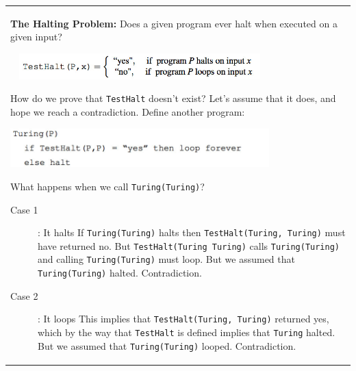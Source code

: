 {\tabulinesep=1mm
\begin{tabu}{|p{16cm} |}
\hline
\textbf{The Halting Problem:} Does a given program ever halt when executed 
on a given input?
\begin{center}
\includegraphics[width=10cm, height=1cm]{intro_testhalt.jpg}
\end{center}

How do we prove that \texttt{TestHalt} doesn’t exist? Let’s assume that it does, 
and hope we reach a contradiction. \newline
Define another program:
\begin{center}
\includegraphics[width=10cm, height=1.5cm]{intro_turing.jpg}
\end{center}
What happens when we call \texttt{Turing(Turing)}?
\begin{solution}[5 cm]
\begin{description}
\item[Case 1]: It halts
If \texttt{Turing(Turing)} halts then \texttt{TestHalt(Turing, Turing)} 
must have returned no. But \texttt{TestHalt(Turing Turing)} calls 
\texttt{Turing(Turing)} and calling \texttt{Turing(Turing)} must loop. 
But we assumed that \texttt{Turing(Turing)} halted. Contradiction.
\item[Case 2]: It loops
This implies that \texttt{TestHalt(Turing, Turing)} returned yes, which by the 
way that \texttt{TestHalt} is defined implies that \texttt{Turing} halted. 
But we assumed  that \texttt{Turing(Turing)} looped. Contradiction.
\end{description}
\end{solution}


\end{tabu}}
